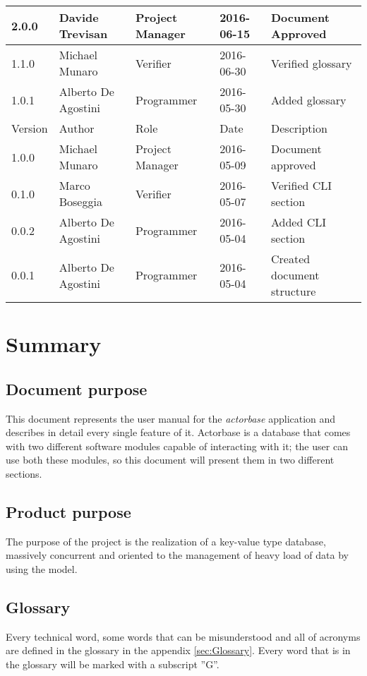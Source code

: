 \documentclass{scalatekids-article}
\begin{document}
\begin{center}
  \begin{longtable}{| l | l | l | l | p{5cm} |}
    \hline
    2.0.0 & Davide Trevisan & Project Manager & 2016-06-15 & Document Approved\\
    \hline
    1.1.0 & Michael Munaro & Verifier & 2016-06-30 & Verified glossary\\
    \hline
    1.0.1 & Alberto De Agostini & Programmer & 2016-05-30 & Added glossary\\
    \hline
    Version & Author & Role & Date & Description \\
    \hline
    1.0.0 & Michael Munaro & Project Manager & 2016-05-09 & Document approved\\
    \hline
    0.1.0 & Marco Boseggia & Verifier & 2016-05-07 & Verified CLI section\\
    \hline
    0.0.2 & Alberto De Agostini & Programmer & 2016-05-04 & Added CLI section\\
    \hline
    0.0.1 & Alberto De Agostini & Programmer & 2016-05-04 & Created document structure\\
    \hline
  \end{longtable}
\end{center}
\tableofcontents
\newpage
{}
\section{Summary}

\subsection{Document purpose}
This document represents the user manual for the \textit{actorbase} application
and describes in detail every single feature of it. Actorbase is a database that
comes with two different software modules capable of interacting with it; the
user can use both these modules, so this document will present them in two
different sections.

\subsection{Product purpose}

The purpose of the project is the realization of a key-value type
 database,
massively concurrent and oriented to the management of heavy load of data by
using the  model.

\subsection{Glossary}
Every technical word, some words that can be misunderstood and all of acronyms are defined in the glossary in the appendix \ref{sec:Glossary}.
Every word that is in the glossary will be marked with a subscript ”G”.
\end{document}
